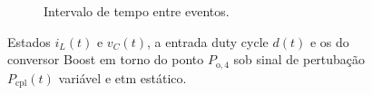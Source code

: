 \begin{figure}[H]
\begin{subfigure}{1.\textwidth}
    \caption{Intervalo de tempo entre eventos.}
    \label{fig:boost_converter_variable_pcpl_static_etm_op2_duty_c}
  \end{subfigure}
  \caption{Estados $i_L(t)$ e $v_C(t)$, a entrada duty cycle $d(t)$ e os  do conversor Boost em torno do ponto $P_{\mathrm{o}, 4}$ sob sinal de pertubação $P_{\mathrm{cpl}}(t)$ variável e \acrshort{etm} estático.}
\end{figure}








